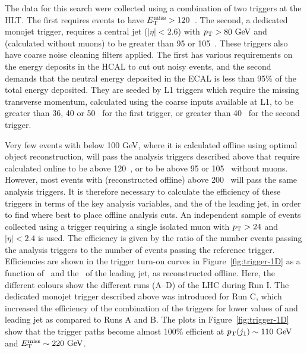 The data for this search were collected using a combination of two triggers at the \ac{HLT}. 
The first requires events to have $E_{\text{T}}^{\text{miss}}>120$~\GeV.
The second, a dedicated monojet trigger, requires a central jet ($|\eta|<2.6$) with $p_{\text{T}}>80~\mathrm{GeV}$ and \MET 
(calculated without muons) to be greater than 95 or 105~\GeV. 
These triggers also have coarse noise cleaning filters applied. 
The first has various requirements on the energy deposits in the \ac{HCAL} to cut out noisy events, 
and the second demands that the neutral energy deposited in the \ac{ECAL} is less than 95\% of the total energy deposited.
They are seeded by \ac{L1} triggers which require the missing transverse momentum, calculated using the coarse inputs available at \ac{L1}, to be greater than 36, 40 or 50~\GeV{} for the first trigger, or greater than 40~\GeV{} for the second trigger. 


Very few events with \MET{} below 100 GeV, where it is calculated offline using optimal object reconstruction,  will pass the analysis triggers described above that require \MET calculated online to be above 120~\GeV, or to be above 95 or 105~\GeV{} without muons. 
However, most events with \MET (reconstructed offline) above 200~\GeV{} will pass the same analysis triggers. 
It is therefore necessary to calculate the efficiency of these triggers in terms of the key analysis variables, \MET and the \pt of the leading jet, in order to find where best to place offline analysis cuts. 
An independent sample of events collected using a trigger requiring a single isolated muon with $p_{\text{T}} > 24$ and $|\eta|<2.4$ is used.
The efficiency is given by the ratio of the number events passing the analysis triggers to the number of events passing the reference trigger. 
Efficiencies are shown in the trigger turn-on curves in Figure~\ref{fig:trigger-1D} as a function of \MET\ and the \pt\ of the leading jet, as reconstructed offline. 
Here, the different colours show the different runs (A--D) of the \ac{LHC} during Run I.
The dedicated monojet trigger described above was introduced for Run C, which increased the efficiency of the combination of the triggers for lower values of \MET and leading jet \pt as compared to Runs A and B. 
The plots in Figure~\ref{fig:trigger-1D} show that the trigger paths become almost 100\% efficient at $p_{\text{T}}(j_{1})\sim110~\mathrm{GeV}$ and $E_{\text{T}}^{\text{miss}}\sim220~\mathrm{GeV}$.

